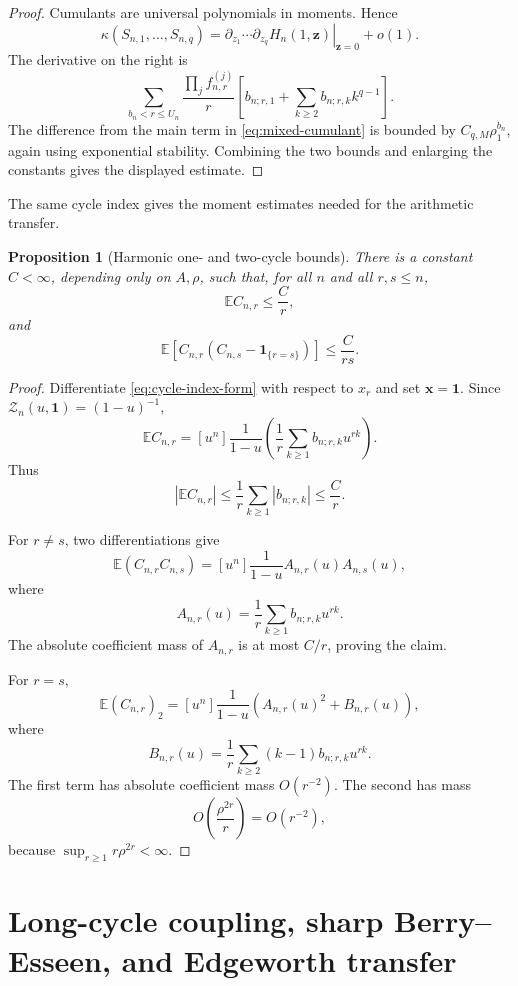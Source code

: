 \documentclass[11pt]{article}
\newtheorem{proposition}[theorem]{Proposition}
\theoremstyle{definition}
\theoremstyle{remark}
\newcommand{\Ee}{\mathbb E}
\newcommand{\one}{\mathbf 1}
\newcommand{\cZ}{\mathcal Z}
\begin{document}
\begin{proof}
Cumulants are universal polynomials in moments.  Hence
\[
 \kappa(S_{n,1},\ldots,S_{n,q})
 =
 \left.
 \partial_{z_1}\cdots\partial_{z_q}
 H_n(1,\mathbf z)
 \right|_{\mathbf z=0}
 +o(1).
\]
The derivative on the right is
\[
 \sum_{b_n<r\le U_n}
 \frac{\prod_jf_{n,r}^{(j)}}r
 \left[
 b_{n;r,1}
 +\sum_{k\ge2}b_{n;r,k}k^{q-1}
 \right].
\]
The difference from the main term in \eqref{eq:mixed-cumulant} is bounded
by $C_{q,M}\rho_1^{b_n}$, again using exponential stability.  Combining
the two bounds and enlarging the constants gives the displayed estimate.
\end{proof}

The same cycle index gives the moment estimates needed for the arithmetic
transfer.

\begin{proposition}[Harmonic one- and two-cycle bounds]
\label{prop:harmonic-moments}
There is a constant $C<\infty$, depending only on $A,\rho$, such that,
for all $n$ and all $r,s\le n$,
\[
 \Ee C_{n,r}\le\frac{C}{r},
\]
and
\[
 \Ee\!\left[
 C_{n,r}(C_{n,s}-\one_{\{r=s\}})
 \right]
 \le\frac{C}{rs}.
\]
\end{proposition}

\begin{proof}
Differentiate \eqref{eq:cycle-index-form} with respect to $x_r$ and set
$\mathbf x=\mathbf1$.  Since $\cZ_n(u,\mathbf1)=(1-u)^{-1}$,
\[
 \Ee C_{n,r}
 =
 [u^n]\frac1{1-u}
 \left(
 \frac1r\sum_{k\ge1}b_{n;r,k}u^{rk}
 \right).
\]
Thus
\[
 |\Ee C_{n,r}|
 \le\frac1r\sum_{k\ge1}|b_{n;r,k}|
 \le\frac{C}{r}.
\]

For $r\ne s$, two differentiations give
\[
 \Ee(C_{n,r}C_{n,s})
 =
 [u^n]\frac1{1-u}A_{n,r}(u)A_{n,s}(u),
\]
where
\[
 A_{n,r}(u)=\frac1r\sum_{k\ge1}b_{n;r,k}u^{rk}.
\]
The absolute coefficient mass of $A_{n,r}$ is at most $C/r$, proving the
claim.

For $r=s$,
\[
 \Ee(C_{n,r})_2
 =
 [u^n]\frac1{1-u}
 \left(A_{n,r}(u)^2+B_{n,r}(u)\right),
\]
where
\[
 B_{n,r}(u)
 =
 \frac1r\sum_{k\ge2}(k-1)b_{n;r,k}u^{rk}.
\]
The first term has absolute coefficient mass $O(r^{-2})$.  The second has
mass
\[
 O\left(\frac{\rho^{2r}}r\right)=O(r^{-2}),
\]
because $\sup_{r\ge1}r\rho^{2r}<\infty$.
\end{proof}

\section{Long-cycle coupling, sharp Berry--Esseen, and Edgeworth transfer}
\label{sec:be}
\end{document}
